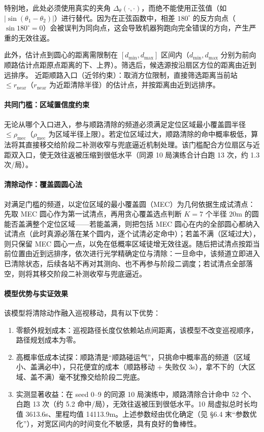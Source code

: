 \documentclass[UTF8, zihao=5,AutoFakeBold=2]{ctexart}
\begin{document}
    特别地，此处必须使用真实的夹角 \(\Delta_\theta(\cdot, \cdot)\)，而绝不能使用正弦值（如 \(|\sin(\theta_1 - \theta_2)|\)）进行替代。因为在正弦函数中，相差 \(180^\circ\) 的反方向点（\(\sin 180^\circ = 0\)）会被误判为同向点，这会导致机器狗跑向完全错误的方向，产生严重的无效往返。
    
    此外，估计点到圆心的距离需限制在 \([d_{\min}, d_{\max}]\) 区间内（\(d_{\min}, d_{\max}\) 分别为前向顺路估计点距原点距离的下、上界）。筛选后，候选源按沿扇区方位的距离由近到远排序。
    近距顺路入口（近邻约束）：取消方位限制，直接筛选距离当前站 \(\leq r_{\text{near}}\)（\(r_{\text{near}}\) 为近距清除半径）的估计点，并按距离由近到远排序。


\paragraph{共同门槛：区域置信度约束}
无论从哪个入口进入，参与顺路清除的频道必须满足定位区域最小覆盖圆半径 \(\leq \rho_{\text{mec}}\)（\(\rho_{\text{mec}}\) 为区域半径上限）。若定位区域过大，顺路清除的命中概率极低，算法将其直接移交给阶段二补测收窄与兜底逼近机制处理。该门槛配合方位扇区与近距双入口，使无效往返被压缩到很低水平（同源 10 局演练合计白跑 13 次，约 1.3 次/局）。

\paragraph{清除动作：覆盖圆圆心法}
对满足门槛的频道，以定位区域的最小覆盖圆（MEC）为几何依据生成试清点：先取 MEC 圆心作为第一试清点，再用贪心覆盖选点判断 \(K=7\) 个半径 \(20\text{m}\) 的圆能否盖满整个定位区域——若能盖满，则把包括 MEC 圆心在内的全部圆心都纳入试清点（此时真源必落在某个圆内，逐个试清必定命中）；若盖不满（区域过大），则只保留 MEC 圆心一点，以免在低概率区域徒增无效往返。随后把试清点按距当前位置由近到远排序，依次进行光学精确定位与清除：一旦命中，该频道立即进入已清除状态，后续各站不再对其测向、也不再参与阶段二调度；若试清点全部落空，则将其移交阶段二补测收窄与兜底逼近。

\paragraph{模型优势与实证效果}
该模型将清除动作融入巡视移动，具有以下优势：
\begin{enumerate}
    \item 零额外规划成本：巡视路径长度仅依赖站点间距离，该模型不改变巡视顺序，路径规划成本为零。
    \item 高概率低成本试探：顺路清是“顺路碰运气”，只挑命中概率高的频道（区域小、盖满必中），只花便宜的成本（顺路移动 + 失败仅 3s），拿不下的（大区域、盖不满）毫不犹豫交给阶段二兜底。
    \item 实测显著收益：在 seed 0--9 的同源 10 局演练中，顺路清除合计命中 52 个、白跑 13 次（约 5.2 命中/局），无效往返被压到很低水平。10 局虚拟总时长均值 3613.6s、里程均值 14113.9m。上述参数经由优化确定（见 \S6.4 末“参数优化”），对宽区间内的时间变化不敏感，具有良好的鲁棒性。
\end{enumerate}
\end{document}
